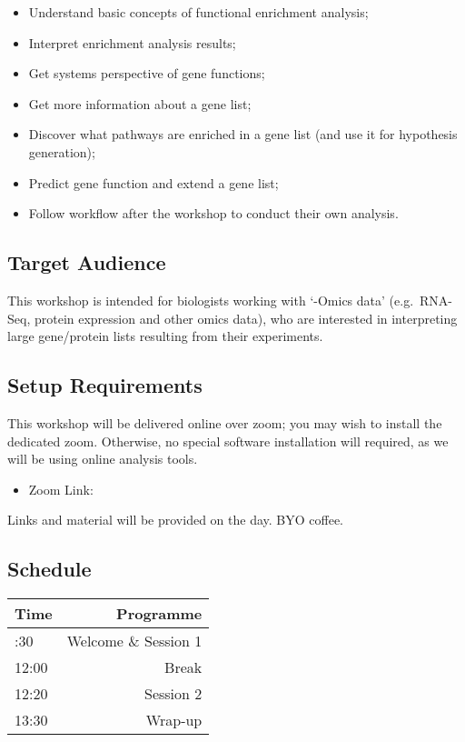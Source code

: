 \documentclass[
]{book}
\providecommand{\tightlist}{%
  \setlength{\itemsep}{0pt}\setlength{\parskip}{0pt}}
\begin{document}
\begin{itemize}
\tightlist
\item
  Understand basic concepts of functional enrichment analysis;
\item
  Interpret enrichment analysis results;
\item
  Get systems perspective of gene functions;
\item
  Get more information about a gene list;
\item
  Discover what pathways are enriched in a gene list (and use it for hypothesis generation);
\item
  Predict gene function and extend a gene list;
\item
  Follow workflow after the workshop to conduct their own analysis.
\end{itemize}

\subsection{Target Audience}\label{target-audience}

This workshop is intended for biologists working with `-Omics data' (e.g.~RNA-Seq, protein expression and other omics data), who are interested in interpreting large gene/protein lists resulting from their experiments.

\subsection{Setup Requirements}\label{setup-requirements}

This workshop will be delivered online over zoom; you may wish to install the dedicated zoom. Otherwise, no special software installation will required, as we will be using online analysis tools.

\begin{itemize}
\tightlist
\item
  Zoom Link:
\end{itemize}

Links and material will be provided on the day. BYO coffee.

\subsection{Schedule}\label{schedule}

\begin{longtable}[]{@{}lr@{}}
\toprule\noalign{}
Time & Programme \\
\midrule\noalign{}
\endhead
\bottomrule\noalign{}
\endlastfoot
10:30 & Welcome \& Session 1 \\
12:00 & Break \\
12:20 & Session 2 \\
13:30 & Wrap-up \\
\end{longtable}
\end{document}
